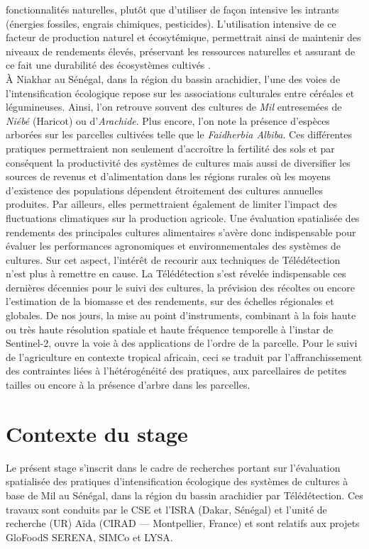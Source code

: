 fonctionnalités naturelles, plutôt que d'utiliser de façon intensive les intrants (énergies fossiles, engrais chimiques, pesticides). L'utilisation intensive de ce facteur de 
production naturel et écosytémique, permettrait ainsi de maintenir des niveaux de rendements élevés, préservant les ressources naturelles et assurant de ce fait une durabilité des
écosystèmes cultivés \cite{Goulet2012}.\\ \`A Niakhar au Sénégal, dans la région du bassin arachidier, l'une des voies de l'intensification écologique repose sur les associations culturales 
entre céréales et légumineuses. Ainsi, l'on retrouve souvent des cultures de \emph{Mil} entresemées de \emph{Niébé} (Haricot) ou d'\emph{Arachide}. Plus encore, l'on note la 
présence d'espèces arborées sur les parcelles cultivées telle que le \emph{Faidherbia Albiba}. Ces différentes pratiques permettraient non seulement d’accroître la fertilité des 
sols et par conséquent la productivité des systèmes de cultures mais aussi de diversifier les sources de revenus et d’alimentation dans les régions rurales où les moyens d’existence
des populations dépendent étroitement des cultures annuelles produites. Par ailleurs, elles permettraient également de limiter l’impact des fluctuations climatiques sur la 
production agricole. Une évaluation spatialisée des rendements des principales cultures alimentaires s'avère donc indispensable pour évaluer les performances agronomiques et 
environnementales des systèmes de cultures. Sur cet aspect, l'intérêt de recourir aux techniques de Télédétection n'est plus à remettre en cause. La Télédétection s'est révelée 
indispensable ces dernières décennies pour le suivi des cultures, la prévision des récoltes ou encore l'estimation de la biomasse et des rendements, sur des échelles régionales et 
globales. De nos jours, la mise au point d'instruments, combinant à la fois haute ou très haute résolution spatiale et haute fréquence temporelle à l'instar de Sentinel-2, ouvre la
voie à des applications de l'ordre de la parcelle. Pour le suivi de l'agriculture en contexte tropical africain, ceci se traduit par l'affranchissement des contraintes liées à 
l'hétérogénéité des pratiques, aux parcellaires de petites tailles ou encore à la présence d’arbre dans les parcelles. 

\section{Contexte du stage}

Le présent stage s'inscrit dans le cadre de recherches portant sur l’évaluation spatialisée des pratiques d’intensification écologique des systèmes de cultures à base de Mil au 
Sénégal, dans la région du bassin arachidier par Télédétection. Ces travaux sont conduits par le CSE et l'ISRA (Dakar, Sénégal) et l'unité de recherche (UR) A\"ida (CIRAD --- 
Montpellier, France) et sont relatifs aux projets GloFoodS SERENA, SIMCo et LYSA. 

